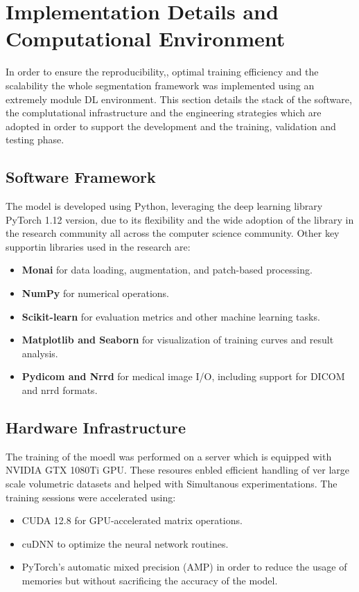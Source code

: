 \section{Implementation Details and Computational Environment}

In order to ensure the reproducibility,, optimal training efficiency and the scalability the whole segmentation framework was implemented using an extremely module DL environment. This section details the stack of the software, the complutational infrastructure and the engineering strategies which are adopted in order to support the development and the training, validation and testing phase.

\subsection{Software Framework}
The model is developed using Python, leveraging the deep learning library PyTorch 1.12 version, due to its flexibility and the wide adoption of the library in the research community all across the computer science community. Other key supportin libraries used in the research are:

\begin{itemize} \item \textbf{Monai} for data loading, augmentation, and patch-based processing. \item \textbf{NumPy} for numerical operations. \item \textbf{Scikit-learn} for evaluation metrics and other machine learning tasks. \item \textbf{Matplotlib and Seaborn} for visualization of training curves and result analysis. \item \textbf{Pydicom and Nrrd} for medical image I/O, including support for DICOM and nrrd formats. \end{itemize}

\subsection{Hardware Infrastructure}
The training of the moedl was performed on a server which is equipped with NVIDIA GTX 1080Ti GPU. These resoures enbled efficient handling of ver large scale volumetric datasets and helped with Simultanous experimentations. The training sessions were accelerated using:

\begin{itemize} \item CUDA 12.8 for GPU-accelerated matrix operations. \item cuDNN to optimize the neural network routines. \item PyTorch's automatic mixed precision (AMP) in order to reduce the usage of memories but without sacrificing the accuracy of the model. \end{itemize}

